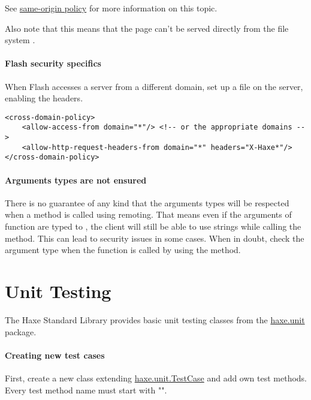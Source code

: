 See \href{http://en.wikipedia.org/wiki/Same-origin_policy}{same-origin policy} for more information on this topic.

Also note that this means that the page can't be served directly from the file system .

\paragraph{Flash security specifics}

When Flash accesses a server from a different domain, set up a  file on the server, enabling the  headers.

\begin{lstlisting}
<cross-domain-policy>
	<allow-access-from domain="*"/> <!-- or the appropriate domains -->
	<allow-http-request-headers-from domain="*" headers="X-Haxe*"/>
</cross-domain-policy>
\end{lstlisting} 

\paragraph{Arguments types are not ensured}

There is no guarantee of any kind that the arguments types will be respected when a method is called using remoting. 
That means even if the arguments of function  are typed to , the client will still be able to use strings while calling the method. 
This can lead to security issues in some cases. When in doubt, check the argument type when the function is called by using the  method.

\section{Unit Testing}
\label{std-unit-testing}

The Haxe Standard Library provides basic unit testing classes from the \href{https://api.haxe.org/haxe/unit/}{haxe.unit} package. 

\paragraph{Creating new test cases}

First, create a new class extending \href{https://api.haxe.org/haxe/unit/TestCase.html}{haxe.unit.TestCase} and add own test methods. Every test method name must start with "".

